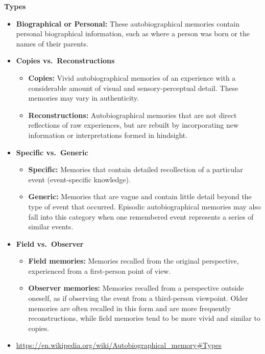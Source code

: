 \documentclass{book}
\providecommand{\ProjectDeepHeading}[2]{%
    \par\medskip\noindent\textbf{#2}\par\smallskip
}
\begin{document}
    
    \ProjectDeepHeading{16}{Types}
        \begin{itemize}
            \item \textbf{Biographical or Personal:}
            These autobiographical memories contain personal biographical information, such as where a person was born or the names of their parents.
            
            \item \textbf{Copies vs.\ Reconstructions}
            \begin{itemize}
                \item \textbf{Copies:} Vivid autobiographical memories of an experience with a considerable amount of visual and sensory-perceptual detail. These memories may vary in authenticity.
                \item \textbf{Reconstructions:} Autobiographical memories that are not direct reflections of raw experiences, but are rebuilt by incorporating new information or interpretations formed in hindsight.
            \end{itemize}
            
            \item \textbf{Specific vs.\ Generic}
            \begin{itemize}
                \item \textbf{Specific:} Memories that contain detailed recollection of a particular event (event-specific knowledge).
                \item \textbf{Generic:} Memories that are vague and contain little detail beyond the type of event that occurred. Episodic autobiographical memories may also fall into this category when one remembered event represents a series of similar events.
            \end{itemize}
            
            \item \textbf{Field vs.\ Observer}
            \begin{itemize}
                \item \textbf{Field memories:} Memories recalled from the original perspective, experienced from a first-person point of view.
                \item \textbf{Observer memories:} Memories recalled from a perspective outside oneself, as if observing the event from a third-person viewpoint. Older memories are often recalled in this form and are more frequently reconstructions, while field memories tend to be more vivid and similar to copies.
            \end{itemize}
            
            \item \url{https://en.wikipedia.org/wiki/Autobiographical_memory\#Types}
        \end{itemize}
\end{document}

